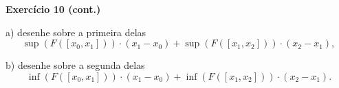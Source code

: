 \documentclass[oneside,12pt]{article}
\begin{document}
\msk

\newpage

{\bf Exercício 10 (cont.)}

\msk

a) desenhe sobre a primeira delas
%
$$\sup(F([x_0,x_1]))·(x_1-x_0) + \sup(F([x_1,x_2]))·(x_2-x_1),$$ 

b) desenhe sobre a segunda delas
%
$$\inf(F([x_0,x_1]))·(x_1-x_0) + \inf(F([x_1,x_2]))·(x_2-x_1).$$




























\end{document}
